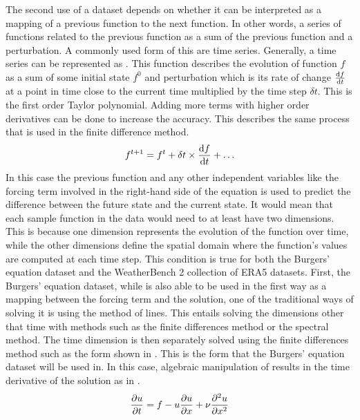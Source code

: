 The second use of a dataset depends on whether it can be interpreted as a mapping of a previous function to the next function. In other words, a series of functions related to the previous function as a sum of the previous function and a perturbation. A commonly used form of this are time series. Generally, a time series can be represented as . This function describes the evolution of function \(f\) as a sum of some initial state \(f^0\) and perturbation which is its rate of change \(\dv{f}{t}\) at a point in time close to the current time multiplied by the time step \(\delta t\). This is the first order Taylor polynomial. Adding more terms with higher order derivatives can be done to increase the accuracy. This describes the same process that is used in the finite difference method.
\begin{equation}
  f^{t+1} = f^{t} + \delta t \times \dv{f}{t} + \dots \label{eq:time_step_function}
\end{equation}
In this case the previous function and any other independent variables like the forcing term involved in the right-hand side of the equation is used to predict the difference between the future state and the current state. It would mean that each sample function in the data would need to at least have two dimensions. This is because one dimension represents the evolution of the function over time, while the other dimensions define the spatial domain where the function's values are computed at each time step. This condition is true for both the Burgers' equation dataset and the WeatherBench 2 collection of ERA5 datasets. First, the Burgers' equation dataset, while is also able to be used in the first way as a mapping between the forcing term and the solution, one of the traditional ways of solving it is using the method of lines. This entails solving the dimensions other that time with methods such as the finite differences method or the spectral method. The time dimension is then separately solved using the finite differences method such as the form shown in  \autocite{schiesserNumericalMethodLines2012,sadikuSimpleIntroductionMethod2000}. This is the form that the Burgers' equation dataset will be used in. In this case, algebraic manipulation of  results in the time derivative of the solution as in .
\begin{align}
  \pdv{u}{t} = f - u\pdv{u}{x} + \nu\pdv[2]{u}{x} \label{eq:forced_viscous_burgers_time_derivative}
\end{align}
